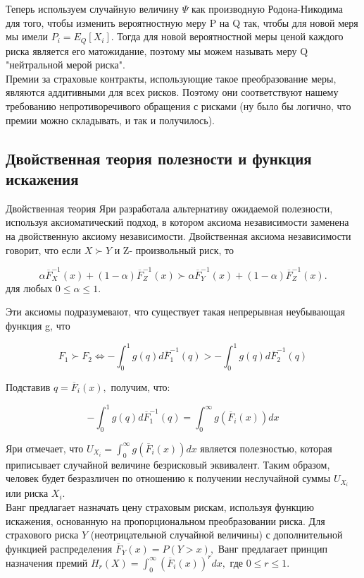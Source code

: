 \documentclass[12pt,a4paper]{article}
\begin{document}
Теперь используем случайную величину $\Psi$ как производную Родона-Никодима для того, чтобы изменить вероятностную меру P на Q так, чтобы для новой меря мы имели $P_i= E_{Q} \left[ X_i  \right].$
Тогда для новой вероятностной меры ценой каждого риска является его матожидание, поэтому мы можем называть меру Q  "нейтральной мерой риска". \\
Премии за страховые контракты, использующие такое преобразование меры, являются аддитивными для всех рисков. Поэтому они соответствуют нашему требованию непротиворечивого обращения с рисками (ну было бы логично, что премии  можно складывать, и так и получилось).\\


\subsection { Двойственная теория полезности и функция искажения }

Двойственная теория Яри разработала альтернативу ожидаемой полезности, используя аксиоматический подход, в котором аксиома независимости заменена на двойственную аксиому независимости.  Двойственная аксиома независимости говорит, что если $ X \succ Y$ и Z- произвольный риск, то

$$\alpha {\overline  F}^{-1}_X(x) + (1-\alpha ){ \overline F}^{-1} _Z(x) \succ \alpha {\overline  F}^{-1}_Y(x) + (1-\alpha ){ \overline F}^{-1} _Z(x).$$
для любых $0 \leq \alpha \leq 1.$

Эти аксиомы подразумевают, что существует такая непрерывная неубывающая функция g, что 

$$F_1 \succ F_2 \Leftrightarrow 
 - \int^{1}_{0} g(q)d{\overline  F}^{-1}_1(q)   >   - \int^{1}_{0} g(q)d{\overline  F}^{-1}_2(q)  $$ 


Подставив $q={\overline  F}_i(x),$ получим,  что:

$$  - \int^{1}_{0} g(q)d{\overline  F}^{-1}_1(q)  = \int^{\infty}_{0} g({\overline  F}_i(x))dx$$

Яри отмечает, что $U_{X_i} =   \int^{\infty}_{0} g({\overline  F}_i(x))dx$ является полезностью, которая приписывает случайной величине безрисковый эквивалент. Таким образом, человек будет безразличен по отношению к получении неслучайной суммы $U_{X_i}$ или риска $X_i.$\\

Ванг предлагает назначать цену страховым рискам, используя функцию искажения, основанную на пропорциональном преобразовании риска. Для страхового риска $Y$ (неотрицательной случайной величины) с дополнительной функцией распределения $ {\overline  F}_Y(x) = P(Y > x),$ Ванг предлагает принцип назначения премий $H_{r}(X) = \int^{\infty}_{0} ({\overline  F}_i(x))^{r}dx, $ где $0 \leq r \leq 1.$
\end{document}
